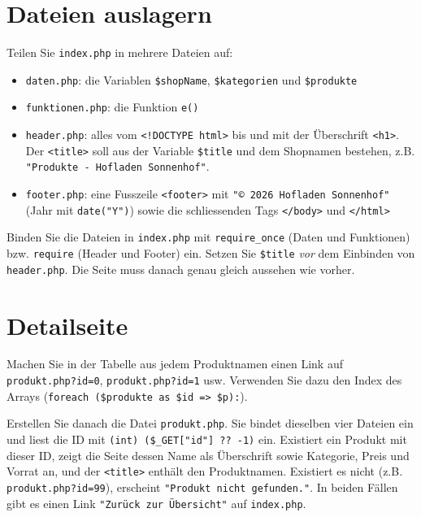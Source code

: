 \documentclass[a4paper,12pt]{article}
\begin{document}
\section{Dateien auslagern}

Teilen Sie \texttt{index.php} in mehrere Dateien auf:

\begin{itemize}
    \item \texttt{daten.php}: die Variablen \texttt{\$shopName}, \texttt{\$kategorien} und \texttt{\$produkte}
    \item \texttt{funktionen.php}: die Funktion \texttt{e()}
    \item \texttt{header.php}: alles vom \texttt{<!DOCTYPE html>} bis und mit der Überschrift \texttt{<h1>}. Der \texttt{<title>} soll aus der Variable \texttt{\$title} und dem Shopnamen bestehen, z.B. \texttt{"{}Produkte - Hofladen Sonnenhof"{}}.
    \item \texttt{footer.php}: eine Fusszeile \texttt{<footer>} mit \texttt{"{}\copyright{} 2026 Hofladen Sonnenhof"{}} (Jahr mit \texttt{date("{}Y"{})}) sowie die schliessenden Tags \texttt{</body>} und \texttt{</html>}
\end{itemize}

Binden Sie die Dateien in \texttt{index.php} mit \texttt{require\_once} (Daten und Funktionen) bzw. \texttt{require} (Header und Footer) ein. Setzen Sie \texttt{\$title} \emph{vor} dem Einbinden von \texttt{header.php}. Die Seite muss danach genau gleich aussehen wie vorher.

\section{Detailseite}

Machen Sie in der Tabelle aus jedem Produktnamen einen Link auf \texttt{produkt.php?id=0}, \texttt{produkt.php?id=1} usw. Verwenden Sie dazu den Index des Arrays (\texttt{foreach (\$produkte as \$id => \$p):}).

Erstellen Sie danach die Datei \texttt{produkt.php}. Sie bindet dieselben vier Dateien ein und liest die ID mit \texttt{(int) (\$\_GET["{}id"{}] ?? -1)} ein. Existiert ein Produkt mit dieser ID, zeigt die Seite dessen Name als Überschrift sowie Kategorie, Preis und Vorrat an, und der \texttt{<title>} enthält den Produktnamen. Existiert es nicht (z.B. \texttt{produkt.php?id=99}), erscheint \texttt{"{}Produkt nicht gefunden."{}}. In beiden Fällen gibt es einen Link \texttt{"{}Zurück zur Übersicht"{}} auf \texttt{index.php}.
\end{document}
